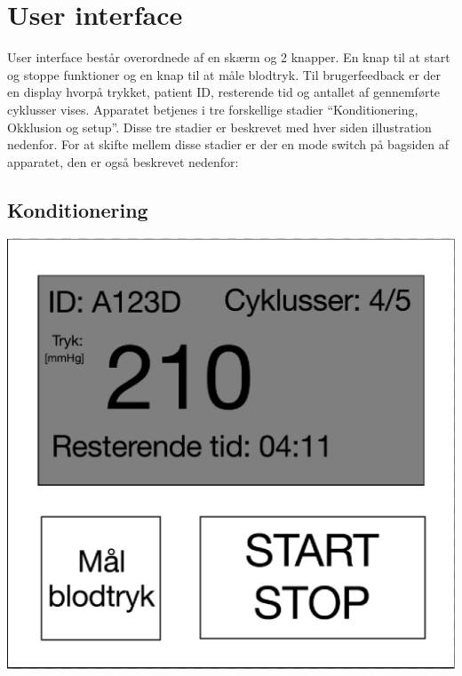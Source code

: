 \section{User interface}
User interface består overordnede af en skærm og 2 knapper. En knap til at start og stoppe funktioner og en knap til at måle blodtryk. Til brugerfeedback er der en display hvorpå trykket, patient ID, resterende tid og antallet af gennemførte cyklusser vises. Apparatet betjenes i tre forskellige stadier “Konditionering, Okklusion og setup”. Disse tre stadier er beskrevet med hver siden illustration nedenfor. For at skifte mellem disse stadier er der en mode switch på bagsiden af apparatet, den er også beskrevet nedenfor: 

\subsection{Konditionering}
\includegraphics[width=\textwidth]{Illustrationer/KonditioneringGUI}
